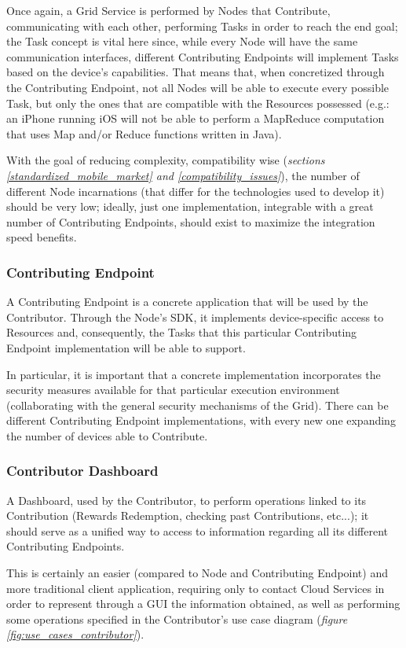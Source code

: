 Once again, a Grid Service is performed by Nodes that Contribute, communicating with each other, performing Tasks in order to reach the end goal; the Task concept is vital here since, while every Node will have the same communication interfaces, different Contributing Endpoints will implement Tasks based on the device's capabilities. That means that, when concretized through the Contributing Endpoint, not all Nodes will be able to execute every possible Task, but only the ones that are compatible with the Resources possessed (e.g.: an iPhone running iOS will not be able to perform a MapReduce computation that uses Map and/or Reduce functions written in Java).

With the goal of reducing complexity, compatibility wise (\textit{sections \ref{standardized_mobile_market} and \ref{compatibility_issues}}), the number of different Node incarnations (that differ for the technologies used to develop it) should be very low; ideally, just one implementation, integrable with a great number of Contributing Endpoints, should exist to maximize the integration speed benefits.

\subsubsection{Contributing Endpoint}
A Contributing Endpoint is a concrete application that will be used by the Contributor. Through the Node's SDK, it implements device-specific access to Resources and, consequently, the Tasks that this particular Contributing Endpoint implementation will be able to support.

In particular, it is important that a concrete implementation incorporates the security measures available for that particular execution environment (collaborating with the general security mechanisms of the Grid).
There can be different Contributing Endpoint implementations, with every new one expanding the number of devices able to Contribute.

\subsubsection{Contributor Dashboard}
A Dashboard, used by the Contributor, to perform operations linked to its Contribution (Rewards Redemption, checking past Contributions, etc...); it should serve as a unified way to access to information regarding all its different Contributing Endpoints.

This is certainly an easier (compared to Node and Contributing Endpoint) and more traditional client application, requiring only to contact Cloud Services in order to represent through a GUI the information obtained, as well as performing some operations specified in the Contributor's use case diagram (\textit{figure \ref{fig:use_cases_contributor}}). 

